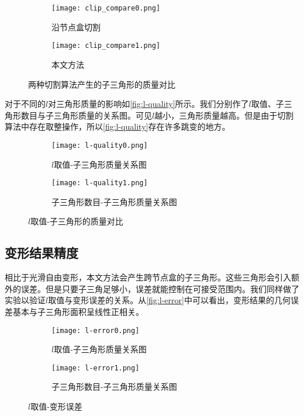 \begin{figure}[htbp]
	\centering
	\begin{subfigure}[b]{.45\textwidth}
		\centering
		\texttt{[image: clip\_compare0.png]}
		\caption{沿节点盒切割}\label{subfig:clip_compare0}
	\end{subfigure}%
	\begin{subfigure}[b]{.45\textwidth}
		\centering
		\texttt{[image: clip\_compare1.png]}
		\caption{本文方法}\label{subfig:clip_compare1}
	\end{subfigure}
	\caption{两种切割算法产生的子三角形的质量对比}\label{fig:triangle_quality_compare}
\end{figure}

对于不同的$l$对三角形质量的影响如\autoref{fig:l-quality}所示。我们分别作了$l$取值、子三角形数目与子三角形质量的关系图。可见$l$越小，三角形质量越高。但是由于切割算法中存在取整操作，所以\autoref{fig:l-quality}存在许多跳变的地方。

\begin{figure}[htbp]
	\centering
	\begin{subfigure}[b]{.45\textwidth}
		\centering
		\texttt{[image: l-quality0.png]}
		\caption{$l$取值-子三角形质量关系图}\label{subfig:l-quality0}
	\end{subfigure}%
	\begin{subfigure}[b]{.45\textwidth}
		\centering
		\texttt{[image: l-quality1.png]}
		\caption{子三角形数目-子三角形质量关系图}\label{subfig:l-quality1}
	\end{subfigure}
	\caption{$l$取值-子三角形的质量对比}\label{fig:l-quality}
\end{figure}

\subsection{变形结果精度}
相比于光滑自由变形，本文方法会产生跨节点盒的子三角形。这些三角形会引入额外的误差。但是只要子三角足够小，误差就能控制在可接受范围内。我们同样做了实验以验证$l$取值与变形误差的关系。从\autoref{fig:l-error}中可以看出，变形结果的几何误差基本与子三角形面积呈线性正相关。
\begin{figure}[htbp]
	\centering
	\begin{subfigure}[b]{.45\textwidth}
		\centering
		\texttt{[image: l-error0.png]}
		\caption{$l$取值-子三角形质量关系图}\label{subfig:l-error0}
	\end{subfigure}%
	\begin{subfigure}[b]{.45\textwidth}
		\centering
		\texttt{[image: l-error1.png]}
		\caption{子三角形数目-子三角形质量关系图}\label{subfig:l-error1}
	\end{subfigure}
	\caption{$l$取值-变形误差}\label{fig:l-error}
\end{figure}
